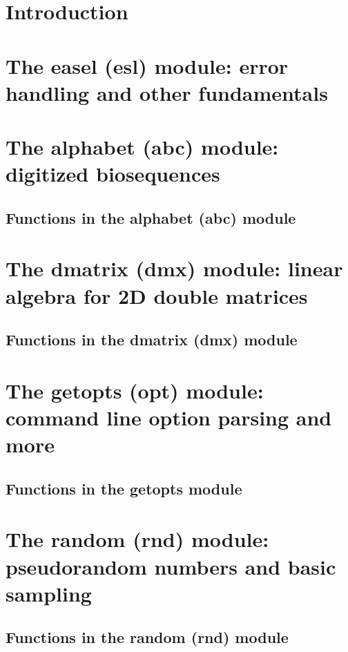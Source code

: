 \documentclass[11pt]{article}
\begin{document}




\newpage
\tableofcontents

\newpage
\section{Introduction}


\newpage
\section{The easel (esl) module: error handling and other fundamentals}


\newpage
\section{The alphabet (abc) module: digitized biosequences}

\subsection{Functions in the alphabet (abc) module}


\newpage
\section{The dmatrix (dmx) module: linear algebra for 2D double matrices}
\subsection{Functions in the dmatrix (dmx) module}


\newpage
\section{The getopts (opt) module: command line option parsing and more}

\subsection{Functions in the getopts module}


\newpage
\section{The random (rnd) module: pseudorandom numbers and basic sampling}

\subsection{Functions in the random (rnd) module}

\end{document}
